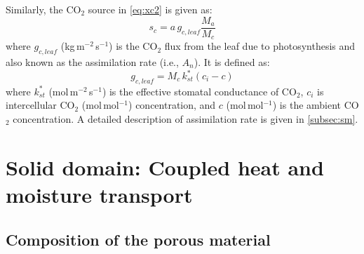 Similarly, the CO$_2$ source in \cref{eq:xc2} is given as:
\begin{equation}
s_c = a\,{g_{\mathit{c,leaf}}} \frac{M_a}{M_c}
\end{equation}
where ${g_{\mathit{c,leaf}}}$ (kg\,m$^{-2}$\,s$^{-1}$) is the CO$_2$ flux from the leaf due to photosynthesis and also known as the assimilation rate (i.e., $A_n$). It is defined as:
\begin{equation}
{g_{\mathit{c,leaf}}} = M_c\, k_{st}^* \left( c_i - c \right)
\label{eq:co2flux}
\end{equation}
where $k_{st}^*$ (mol\,m$^{-2}$\,s$^{-1}$) is the effective stomatal conductance of CO$_2$, $c_i$ is intercellular CO$_2$ (mol\,mol$^{-1}$) concentration, and $c$ (mol\,mol$^{-1}$) is the ambient CO$_2$ concentration. A detailed description of assimilation rate is given in \cref{subsec:sm}.

\section{Solid domain: Coupled heat and moisture transport}
\label{sec:soliddomain}
\subsection{Composition of the porous material}

